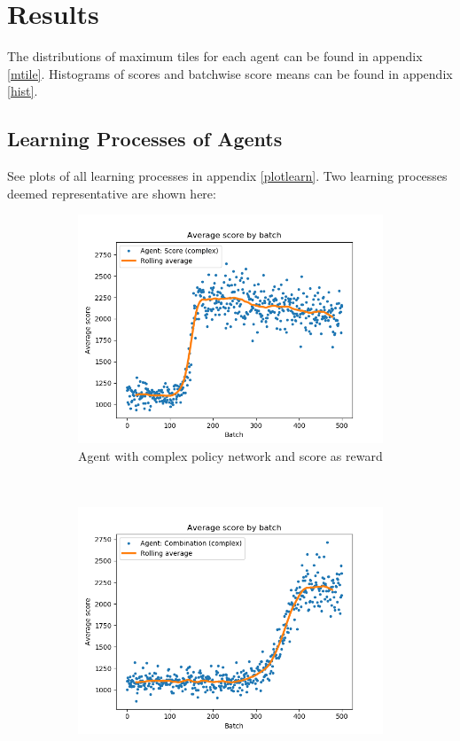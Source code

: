 \documentclass[11pt, fleqn]{article}
\begin{document}
\section{Results}
The distributions of maximum tiles for each agent can be found in appendix \ref{mtile}.
Histograms of scores and batchwise score means can be found in appendix \ref{hist}.
\subsection*{Learning Processes of Agents}

See plots of all learning processes in appendix \ref{plotlearn}. Two learning processes deemed representative are shown here:
\begin{figure}[h!]
	\centering
	\begin{subfigure}[t]{0.4\linewidth}
		\centering
		\captionsetup{width=.8\textwidth}
		\includegraphics[width = \textwidth]{"clean_train_score_complex"}
		\caption{Agent with complex policy network and score as reward}
	\end{subfigure}%
	~ \hspace{1cm}
	\begin{subfigure}[t]{0.4\linewidth}
		\centering
		\captionsetup{width=.8\textwidth}
		\includegraphics[width = \linewidth]{"clean_train_combination_complex"}

\end{subfigure}
\end{figure}
\end{document}
